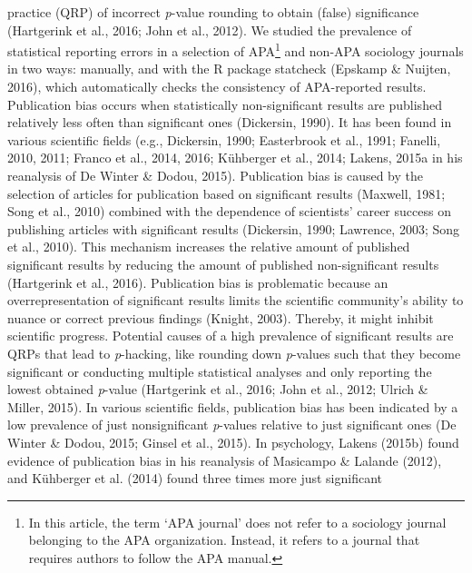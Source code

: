 \documentclass[
  12pt,
]{article}
\begin{document}
practice (QRP) of incorrect \emph{p}-value rounding to obtain (false)
significance (Hartgerink et al., 2016; John et al., 2012). We studied
the prevalence of statistical reporting errors in a selection of
APA\footnote{In this article, the term `APA journal' does not refer to a
  sociology journal belonging to the APA organization. Instead, it
  refers to a journal that requires authors to follow the APA manual.}
and non-APA sociology journals in two ways: manually, and with the R
package statcheck (Epskamp \& Nuijten, 2016), which automatically checks
the consistency of APA-reported results.\\
\hspace*{0.333em}\hspace*{0.333em}\hspace*{0.333em}\hspace*{0.333em}Publication
bias occurs when statistically non-significant results are published
relatively less often than significant ones (Dickersin, 1990). It has
been found in various scientific fields (e.g., Dickersin, 1990;
Easterbrook et al., 1991; Fanelli, 2010, 2011; Franco et al., 2014,
2016; Kühberger et al., 2014; Lakens, 2015a in his reanalysis of De
Winter \& Dodou, 2015). Publication bias is caused by the selection of
articles for publication based on significant results (Maxwell, 1981;
Song et al., 2010) combined with the dependence of scientists' career
success on publishing articles with significant results (Dickersin,
1990; Lawrence, 2003; Song et al., 2010). This mechanism increases the
relative amount of published significant results by reducing the amount
of published non-significant results (Hartgerink et al., 2016).
Publication bias is problematic because an overrepresentation of
significant results limits the scientific community's ability to nuance
or correct previous findings (Knight, 2003). Thereby, it might inhibit
scientific progress. Potential causes of a high prevalence of
significant results are QRPs that lead to \emph{p}-hacking, like
rounding down \emph{p}-values such that they become significant or
conducting multiple statistical analyses and only reporting the lowest
obtained \emph{p}-value (Hartgerink et al., 2016; John et al., 2012;
Ulrich \& Miller, 2015). In various scientific fields, publication bias
has been indicated by a low prevalence of just nonsignificant
\emph{p}-values relative to just significant ones (De Winter \& Dodou,
2015; Ginsel et al., 2015). In psychology, Lakens (2015b) found evidence
of publication bias in his reanalysis of Masicampo \& Lalande (2012),
and Kühberger et al. (2014) found three times more just significant
\end{document}
